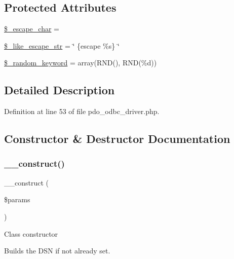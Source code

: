 \subsection*{Protected Attributes}
\begin{DoxyCompactItemize}
\item 
\mbox{\hyperlink{class_c_i___d_b__pdo__odbc__driver_aaec2fb0112850159063a8e47ad3aed6e}{\$\+\_\+escape\+\_\+char}} = \textquotesingle{}\textquotesingle{}
\item 
\mbox{\hyperlink{class_c_i___d_b__pdo__odbc__driver_adf86ecadf3d0e1ce3f5e0eaeeb3867ae}{\$\+\_\+like\+\_\+escape\+\_\+str}} = \char`\"{} \{escape \textquotesingle{}\%s\textquotesingle{}\} \char`\"{}
\item 
\mbox{\hyperlink{class_c_i___d_b__pdo__odbc__driver_a10213aa6e05f6d924d3277bb1d2fea00}{\$\+\_\+random\+\_\+keyword}} = array(\textquotesingle{}R\+ND()\textquotesingle{}, \textquotesingle{}R\+ND(\%d)\textquotesingle{})
\end{DoxyCompactItemize}


\subsection{Detailed Description}


Definition at line 53 of file pdo\+\_\+odbc\+\_\+driver.\+php.



\subsection{Constructor \& Destructor Documentation}
\mbox{\label{class_c_i___d_b__pdo__odbc__driver_a9162320adff1a1a4afd7f2372f753a3e}} 
\subsubsection{\texorpdfstring{\_\_construct()}{\_\_construct()}}
{\footnotesize\ttfamily \+\_\+\+\_\+construct (\begin{DoxyParamCaption}\item[{}]{\$params }\end{DoxyParamCaption})}

Class constructor

Builds the D\+SN if not already set.


